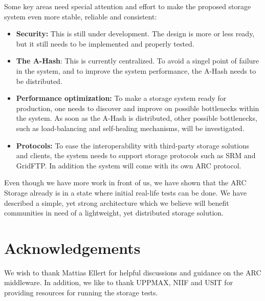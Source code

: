 \documentclass[final]{ieee}
\begin{document}
Some key areas need special attention and effort to make the proposed
storage system even more stable, reliable and consistent:
\begin{itemize}
\item \textbf{Security:} This is still under development. The design is more
  or less ready, but it still needs to be implemented and properly
  tested.
\item \textbf{The A-Hash}: This is currently centralized. To avoid a singel
  point of failure in the system, and to improve the system
  performance, the A-Hash needs to be distributed.
\item \textbf{Performance optimization:} To make a storage system
  ready for production, one needs to discover and improve on
  possible bottlenecks within the system. As soon as the A-Hash is
  distributed, other possible bottlenecks, such as load-balancing
  and self-healing mechanisms, will be investigated.
\item \textbf{Protocols:} To ease the interoperability with third-party
  storage solutions and clients, the system needs to support storage
  protocols such as SRM and GridFTP. In addition the system will come
  with its own ARC protocol.
\end{itemize}

Even though we have more work in front of us, we have shown that the
ARC Storage already is in a state where initial real-life tests can be
done. We have described a simple, yet strong architecture which we
believe will benefit communities in need of a lightweight,
yet distributed storage solution.


\section{Acknowledgements}
\label{Acknowledgements}

We wish to thank Mattias Ellert for helpful discussions and guidance
on the ARC middleware. In addition, we like to thank UPPMAX, NIIF and USIT for
providing resources for running the storage tests.

\end{document}
